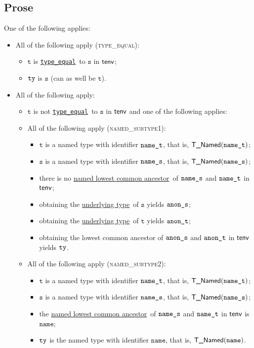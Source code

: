 \documentclass{book}
\newcommand\ProseOrTypeError[0]{\ProseTerminateAs{\TypeErrorConfig}}
\newcommand\typeequal[0]{\hyperlink{def-typeequal}{\texttt{type\_equal}}}
\newcommand\underlyingtype[0]{\hyperlink{def-underlyingtype}{underlying type}}
\newcommand\namedlowestcommonancestor[0]{\hyperlink{def-namedlowestcommonancestor}{named lowest common ancestor}}
\newcommand\vt[0]{\texttt{t}}
\newcommand\vs[0]{\texttt{s}}
\newcommand\name[0]{\texttt{name}}
\begin{document}
\subsection{Prose}
One of the following applies:
\begin{itemize}
  \item All of the following apply (\textsc{type\_equal}):
  \begin{itemize}
    \item $\vt$ is \typeequal\ to $\vs$ in $\textsf{tenv}$;
    \item $\texttt{ty}$ is $\vs$ (can as well be $\vt$).
  \end{itemize}

  \item All of the following apply:
  \begin{itemize}
    \item $\vt$ is not \typeequal\ to $\vs$ in $\textsf{tenv}$ and one of the following applies:

    \item All of the following apply (\textsc{named\_subtype1}):
    \begin{itemize}
      \item $\vt$ is a named type with identifier $\texttt{name\_t}$, that is, $\textsf{T\_Named}(\texttt{name\_t})$;
      \item $\vs$ is a named type with identifier $\texttt{name\_s}$, that is, $\textsf{T\_Named}(\texttt{name\_s})$;
      \item there is no \namedlowestcommonancestor\ of $\texttt{name\_s}$ and $\texttt{name\_t}$ in $\textsf{tenv}$;
      \item obtaining the \underlyingtype\ of $\vs$ yields $\texttt{anon\_s}$\ProseOrTypeError;
      \item obtaining the \underlyingtype\ of $\vt$ yields $\texttt{anon\_t}$\ProseOrTypeError;
      \item obtaining the lowest common ancestor of $\texttt{anon\_s}$ and $\texttt{anon\_t}$ in $\textsf{tenv}$ yields $\texttt{ty}$\ProseOrTypeError.
    \end{itemize}

    \item All of the following apply (\textsc{named\_subtype2}):
    \begin{itemize}
      \item $\vt$ is a named type with identifier $\texttt{name\_t}$, that is, $\textsf{T\_Named}(\texttt{name\_t})$;
      \item $\vs$ is a named type with identifier $\texttt{name\_s}$, that is, $\textsf{T\_Named}(\texttt{name\_s})$;
      \item the \namedlowestcommonancestor\ of $\texttt{name\_s}$ and $\texttt{name\_t}$ in $\textsf{tenv}$ is \\
            $\name$\ProseOrTypeError;
      \item $\texttt{ty}$ is the named type with identifier $\name$, that is, $\TNamed(\name)$.
    \end{itemize}


\end{itemize}
\end{itemize}
\end{document}
